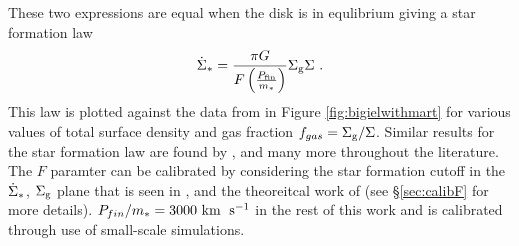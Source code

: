These two expressions are equal when the disk is in equlibrium giving a star formation law
\begin{equation}
\label{eqn:martsfr}
\dot{\Sigma}_* = \frac{\pi G}{F \left(\frac{P_\mathrm{fin}}{m_*}\right)} \Sigma_\mathrm{g} \Sigma~.
\end{equation}
This law is plotted against the data from \citet{bigiel_star_2008} in Figure \ref{fig:bigielwithmart} for various values of total surface density and gas fraction $f_{gas} = \Sigma_\mathrm{g}/\Sigma$.
Similar results for the star formation law are found by \citet{ostriker_maximally_2011, faucher-giguere_feedback-regulated_2013, martizzi_supernova_2016}, and many more throughout the literature.
The $F$ paramter can be calibrated by considering the star formation cutoff in the $\dot{\Sigma}_*$, $\Sigma_\mathrm{g}$ plane that is seen in \citet{bigiel_star_2008}, and the theoreitcal work of \citet{schaye_star_2004} (see \S \ref{sec:calibF} for more details).
$P_{fin}/m_* = 3000 ~\mathrm{km}\;~\mathrm{s}^{-1}$ in the rest of this work and is calibrated through use of small-scale simulations.
